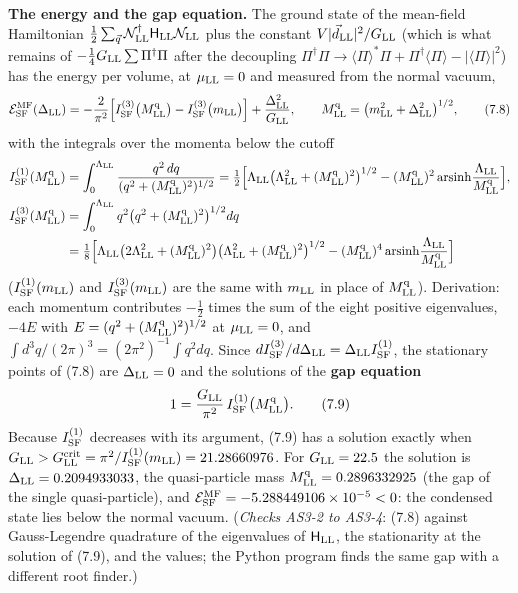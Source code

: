 \documentclass[
  10pt,
]{article}
\begin{document}
\textbf{The energy and the gap equation.} The ground state of the
mean-field Hamiltonian
\(\tfrac12\sum_{\vec q}\mathcal N_{\rm LL}^\dagger\mathsf H_{\rm LL}\mathcal N_{\rm LL}\)
plus the constant \(V\lvert\vec d_{\rm LL}\rvert^2/G_{\rm LL}\) (which
is what remains of \(-\tfrac14G_{\rm LL}\sum\Pi^\dagger\Pi\) after the
decoupling
\(\Pi^\dagger\Pi\to\langle\Pi\rangle^*\Pi+\Pi^\dagger\langle\Pi\rangle-\lvert\langle\Pi\rangle\rvert^2\))
has the energy per volume, at \(\mu_{\rm LL}=0\) and measured from the
normal vacuum,
\[\mathcal E^{\rm MF}_{\rm SF}(\Delta_{\rm LL})=-\frac2{\pi^2}\Big[I^{(3)}_{\rm SF}\big(M^{\rm q}_{\rm LL}\big)-I^{(3)}_{\rm SF}\big(m_{\rm LL}\big)\Big]+\frac{\Delta_{\rm LL}^2}{G_{\rm LL}},\qquad M^{\rm q}_{\rm LL}=\big(m_{\rm LL}^2+\Delta_{\rm LL}^2\big)^{1/2},\tag{7.8}\]
with the integrals over the momenta below the cutoff
\[\begin{aligned}I^{(1)}_{\rm SF}(M^{\rm q}_{\rm LL})&=\int_0^{\Lambda_{\rm LL}}\frac{q^2\,dq}{(q^2+(M^{\rm q}_{\rm LL})^2)^{1/2}}=\tfrac12\Big[\Lambda_{\rm LL}\big(\Lambda_{\rm LL}^2+(M^{\rm q}_{\rm LL})^2\big)^{1/2}-(M^{\rm q}_{\rm LL})^2\,\mathrm{arsinh}\frac{\Lambda_{\rm LL}}{M^{\rm q}_{\rm LL}}\Big],\\I^{(3)}_{\rm SF}(M^{\rm q}_{\rm LL})&=\int_0^{\Lambda_{\rm LL}}q^2\big(q^2+(M^{\rm q}_{\rm LL})^2\big)^{1/2}dq\\&=\tfrac18\Big[\Lambda_{\rm LL}\big(2\Lambda_{\rm LL}^2+(M^{\rm q}_{\rm LL})^2\big)\big(\Lambda_{\rm LL}^2+(M^{\rm q}_{\rm LL})^2\big)^{1/2}-(M^{\rm q}_{\rm LL})^4\,\mathrm{arsinh}\frac{\Lambda_{\rm LL}}{M^{\rm q}_{\rm LL}}\Big]\end{aligned}\]
(\(I^{(1)}_{\rm SF}(m_{\rm LL})\) and \(I^{(3)}_{\rm SF}(m_{\rm LL})\)
are the same with \(m_{\rm LL}\) in place of \(M^{\rm q}_{\rm LL}\)).
Derivation: each momentum contributes \(-\tfrac12\) times the sum of the
eight positive eigenvalues, \(-4E\) with
\(E=(q^2+(M^{\rm q}_{\rm LL})^2)^{1/2}\) at \(\mu_{\rm LL}=0\), and
\(\int d^3q/(2\pi)^3=(2\pi^2)^{-1}\int q^2dq\). Since
\(dI^{(3)}_{\rm SF}/d\Delta_{\rm LL}=\Delta_{\rm LL}I^{(1)}_{\rm SF}\),
the stationary points of (7.8) are \(\Delta_{\rm LL}=0\) and the
solutions of the \textbf{gap equation}
\[1=\frac{G_{\rm LL}}{\pi^2}\,I^{(1)}_{\rm SF}\big(M^{\rm q}_{\rm LL}\big).\tag{7.9}\]
Because \(I^{(1)}_{\rm SF}\) decreases with its argument, (7.9) has a
solution exactly when
\(G_{\rm LL}>G^{\rm crit}_{\rm LL}=\pi^2/I^{(1)}_{\rm SF}(m_{\rm LL})=21.28660976\).
For \(G_{\rm LL}=22.5\) the solution is
\(\Delta_{\rm LL}=0.2094933033\), the quasi-particle mass
\(M^{\rm q}_{\rm LL}=0.2896332925\) (the gap of the single
quasi-particle), and
\(\mathcal E^{\rm MF}_{\rm SF}=-5.288449106\times10^{-5}<0\): the
condensed state lies below the normal vacuum. (\emph{Checks AS3-2 to
AS3-4}: (7.8) against Gauss-Legendre quadrature of the eigenvalues of
\(\mathsf H_{\rm LL}\), the stationarity at the solution of (7.9), and
the values; the Python program finds the same gap with a different root
finder.)
\end{document}
